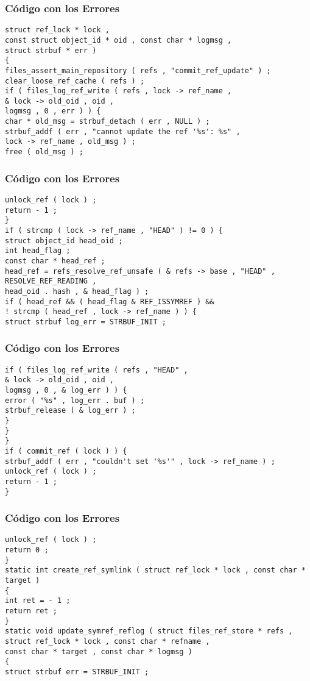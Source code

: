 \documentclass{beamer}
\begin{document}
\begin{frame}[fragile]
\frametitle{C\'odigo con los Errores}
\begin{verbatim}
struct ref_lock * lock , 
const struct object_id * oid , const char * logmsg , 
struct strbuf * err ) 
{ 
files_assert_main_repository ( refs , "commit_ref_update" ) ; 
clear_loose_ref_cache ( refs ) ; 
if ( files_log_ref_write ( refs , lock -> ref_name , 
& lock -> old_oid , oid , 
logmsg , 0 , err ) ) { 
char * old_msg = strbuf_detach ( err , NULL ) ; 
strbuf_addf ( err , "cannot update the ref '%s': %s" , 
lock -> ref_name , old_msg ) ; 
free ( old_msg ) ; 
\end{verbatim}
\end{frame}
\begin{frame}[fragile]
\frametitle{C\'odigo con los Errores}
\begin{verbatim}
unlock_ref ( lock ) ; 
return - 1 ; 
} 
if ( strcmp ( lock -> ref_name , "HEAD" ) != 0 ) { 
struct object_id head_oid ; 
int head_flag ; 
const char * head_ref ; 
head_ref = refs_resolve_ref_unsafe ( & refs -> base , "HEAD" , 
RESOLVE_REF_READING , 
head_oid . hash , & head_flag ) ; 
if ( head_ref && ( head_flag & REF_ISSYMREF ) && 
! strcmp ( head_ref , lock -> ref_name ) ) { 
struct strbuf log_err = STRBUF_INIT ; 
\end{verbatim}
\end{frame}
\begin{frame}[fragile]
\frametitle{C\'odigo con los Errores}
\begin{verbatim}
if ( files_log_ref_write ( refs , "HEAD" , 
& lock -> old_oid , oid , 
logmsg , 0 , & log_err ) ) { 
error ( "%s" , log_err . buf ) ; 
strbuf_release ( & log_err ) ; 
} 
} 
} 
if ( commit_ref ( lock ) ) { 
strbuf_addf ( err , "couldn't set '%s'" , lock -> ref_name ) ; 
unlock_ref ( lock ) ; 
return - 1 ; 
} 
\end{verbatim}
\end{frame}
\begin{frame}[fragile]
\frametitle{C\'odigo con los Errores}
\begin{verbatim}
unlock_ref ( lock ) ; 
return 0 ; 
} 
static int create_ref_symlink ( struct ref_lock * lock , const char * target ) 
{ 
int ret = - 1 ; 
return ret ; 
} 
static void update_symref_reflog ( struct files_ref_store * refs , 
struct ref_lock * lock , const char * refname , 
const char * target , const char * logmsg ) 
{ 
struct strbuf err = STRBUF_INIT ; 
\end{verbatim}
\end{frame}
\end{document}
